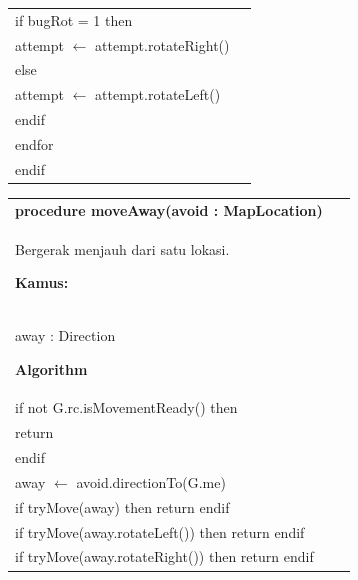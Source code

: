 \documentclass{article}
\newenvironment{pseudobox}
{
\centering
\begin{longtable}{|p{0.94\linewidth}|}
\hline
}
{
\\ \hline
\end{longtable}
\vspace{0.05cm}
}
\begin{document}
\begin{pseudobox}
\hspace*{3em} if bugRot = 1 then \\
\hspace*{4em} attempt $\leftarrow$ attempt.rotateRight() \\
\hspace*{3em} else \\
\hspace*{4em} attempt $\leftarrow$ attempt.rotateLeft() \\
\hspace*{3em} endif \\
\hspace*{2em} endfor \\
\hspace*{1em} endif
\end{pseudobox}

\begin{pseudobox}
\textbf{procedure moveAway(avoid : MapLocation)} \\
{ Bergerak menjauh dari satu lokasi. }

\textbf{Kamus:} \\
\hspace*{1em} away : Direction

\textbf{Algorithm} \\
\hspace*{1em} if not G.rc.isMovementReady() then \\
\hspace*{2em} return \\
\hspace*{1em} endif \\

\hspace*{1em} away $\leftarrow$ avoid.directionTo(G.me) \\

\hspace*{1em} if tryMove(away) then return endif \\
\hspace*{1em} if tryMove(away.rotateLeft()) then return endif \\
\hspace*{1em} if tryMove(away.rotateRight()) then return endif
\end{pseudobox}
\end{document}
